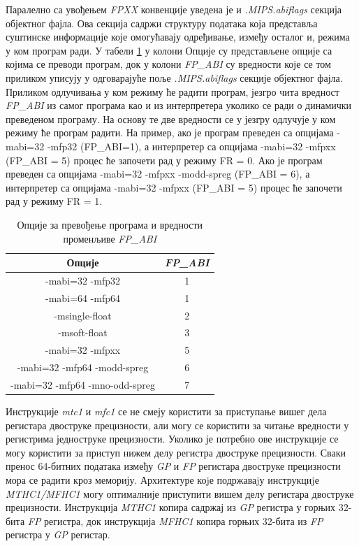 \documentclass[12pt,oneside]{memoir}
\begin{document}
\indent Паралелно са увођењем \textit{FPXX} конвенције уведена је и  \textit{.MIPS.abiflags} секција објектног фајла. Ова секција садржи структуру података која представља суштинске информације које омогућавају одређивање, између осталог и, режима у ком програм ради. У табели \ref{tbl:fpabi} у колони Опције су представљене опције са којима се преводи програм, док у колони \textit{FP\_ABI} су вредности које се том приликом уписују у одговарајуће поље \textit{.MIPS.abiflags} секције објектног фајла. Приликом одлучивања у ком режиму ће радити програм, језгро чита вредност \textit{FP\_ABI} из самог програма као и из интерпретера уколико се ради о динамички преведеном програму. На основу те две вредности се у језгру одлучује у ком режиму ће програм радити. На пример, ако је програм преведен са опцијама -mabi=32 -mfp32 (FP\_ABI=1), а интерпретер са опцијама  -mabi=32 -mfpxx (FP\_ABI = 5) процес ће започети рад у режиму FR = 0. Ако је програм преведен са опцијама -mabi=32 -mfpxx -modd-spreg (FP\_ABI = 6), а интерпретер са опцијама  -mabi=32 -mfpxx (FP\_ABI = 5) процес ће започети рад у режиму FR = 1.


\begin{table}
\centering
\caption{Опције за превођење програма и вредности променљиве \textit{FP\_ABI}}
\label{tbl:fpabi}
\begin{tabular}{ |c|c| }
Опције & \textit{FP\_ABI} \\\midrule
-mabi=32 -mfp32 & 1 \\
-mabi=64 -mfp64 & 1 \\
-msingle-float  & 2 \\
-msoft-float    & 3 \\
-mabi=32 -mfpxx & 5 \\
-mabi=32 -mfp64 -modd-spreg & 6 \\
-mabi=32 -mfp64 -mno-odd-spreg & 7 \\
\end{tabular}
\end{table}

\indent Инструкције \textit{mtc1} и \textit{mfc1} се не смеју користити за приступање вишег дела регистара двоструке прецизности, али могу се користити за читање вредности у регистрима једноструке прецизности. Уколико је потребно ове инструкције се могу користити за приступ нижем делу регистра двоструке прецизности. Сваки пренос 64-битних података између \textit{GP} и \textit{FP} регистара двоструке прецизности мора се радити кроз меморију. Архитектуре коjе подржаваjу инструкциjе \textit{MTHC1/MFHC1} могу оптималније приступити вишем делу регистара двоструке прецизности. Инструкција \textit{MTHC1} копира садржај из \textit{GP} регистра у горњих 32-бита \textit{FP} регистра, док инструкција \textit{MFHC1} копира горњих 32-бита из \textit{FP} регистра у \textit{GP} регистар.
\end{document}
